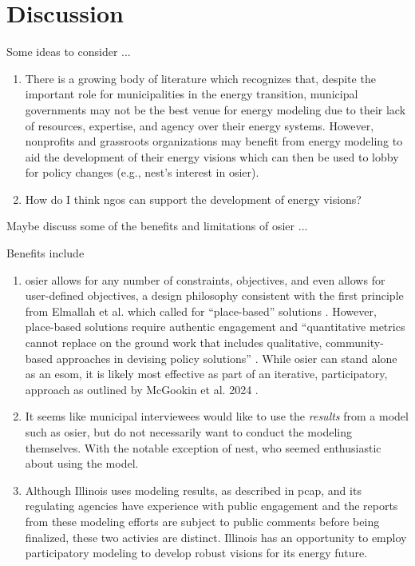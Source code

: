 \section{Discussion}

Some ideas to consider ...

\begin{enumerate}
    \item There is a growing body of literature which recognizes that, despite
    the important role for municipalities in the energy transition, municipal
    governments may not be the best venue for energy modeling due to their lack
    of resources, expertise, and agency over their energy systems. However,
    nonprofits and grassroots organizations may benefit from energy modeling to
    aid the development of their energy visions which can then be used to lobby
    for policy changes (e.g., \ac{nest}'s interest in \ac{osier}).
    \item How do I think \acp{ngo} can support the development of energy visions?
\end{enumerate}

Maybe discuss some of the benefits and limitations of \ac{osier} ...

Benefits include
\begin{enumerate}
    \item \ac{osier} allows for any number of constraints, objectives, and even
    allows for user-defined objectives, a design philosophy consistent with the
    first principle from Elmallah et al. which called for ``place-based''
    solutions \cite{elmallah_frontlining_2022}. However, place-based solutions
    require authentic engagement and ``quantitative metrics cannot replace on
    the ground work that includes qualitative, community-based approaches in
    devising policy solutions'' \cite{elmallah_frontlining_2022}. While
    \ac{osier} can stand alone as an \ac{esom}, it is likely most effective as
    part of an iterative, participatory, approach as outlined by McGookin et al.
    2024 \cite{mcgookin_advancing_2024}.
    \item It seems like municipal interviewees would like to use the \textit{results} from a model
    such as \ac{osier}, but do not necessarily want to conduct the modeling themselves. With the
    notable exception of \ac{nest}, who seemed enthusiastic about using the model.
    \item Although Illinois uses modeling results, as described in \ac{pcap}, and its regulating agencies
    have experience with public engagement and the reports from these modeling efforts are subject to public
    comments before being finalized, these two activies are distinct. Illinois has an opportunity to 
    employ participatory modeling to develop robust visions for its energy future.
\end{enumerate}